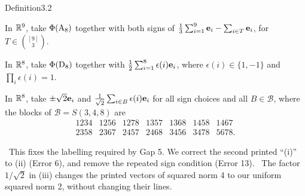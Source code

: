 \begin{cgss}{Definition}{3.2}\label{def:3.2}
 \begin{pfenum}
  \item In ${\mathbb R}^9$, take $\Phi(\mathrm{A}_8)$ together with both signs of
  $\frac13\sum_{i=1}^9{\mathbf e}_i-\sum_{i\in T}{\mathbf e}_i$, for $T\in\binom{[9]}3$.
  \item In ${\mathbb R}^8$, take $\Phi(\mathrm{D}_8)$ together with
  $\frac12\sum_{i=1}^8\epsilon(i){\mathbf e}_i$, where $\epsilon(i)\in\{1,-1\}$ and
  $\prod_i\epsilon(i)=1$.
  \item In ${\mathbb R}^8$, take $\pm\sqrt2{\mathbf e}_i$ and
  $\frac1{\sqrt2}\sum_{i\in B}\epsilon(i){\mathbf e}_i$ for all sign choices and all
  $B\in\mathcal B$, where the blocks of $\mathcal B=S(3,4,8)$ are
  \[
  \begin{array}{rrrrrrr}
  1234&1256&1278&1357&1368&1458&1467\\
  2358&2367&2457&2468&3456&3478&5678.
  \end{array}
  \]
 \end{pfenum}
 \repair\ This fixes the labelling required by Gap 5. We correct the second
 printed ``(i)'' to (ii) (Error 6), and remove the repeated sign condition
 (Error 13). \new\ The factor $1/\sqrt2$ in (iii) changes the printed vectors
 of squared norm 4 to our uniform squared norm 2, without changing their lines.
\end{cgss}

